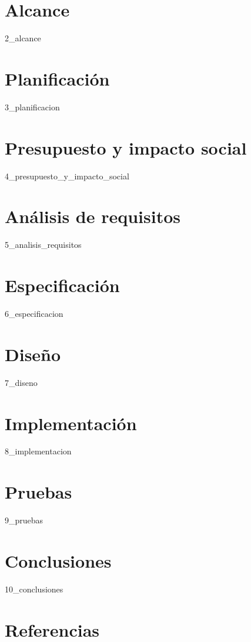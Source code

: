 \documentclass[13pt]{article}
\newcommand\blankpage{%
    \null
    \thispagestyle{empty}%
    \addtocounter{page}{-1}%
    \newpage}
\begin{document}
\newpage
\section{Alcance}
{2_alcance}
\afterpage{\blankpage}

\newpage
\section{Planificación}
\label{sec:planificacion}
{3_planificacion}
\afterpage{\blankpage}

\newpage
\section{Presupuesto y impacto social}
{4_presupuesto_y_impacto_social}
\afterpage{\blankpage}
\newpage
\section{Análisis de requisitos}
{5_analisis_requisitos}
\afterpage{\blankpage}

\newpage
\section{Especificación}
{6_especificacion}
\afterpage{\blankpage}
\newpage
\section{Diseño}
{7_diseno}
\afterpage{\blankpage}
\newpage
\section{Implementación}
{8_implementacion}
\afterpage{\blankpage}

\newpage
\section{Pruebas}
{9_pruebas}
\afterpage{\blankpage}
\newpage
\section{Conclusiones}
{10_conclusiones}
\afterpage{\blankpage}
\newpage
\section{Referencias}

\nocite{*}

\end{document}
